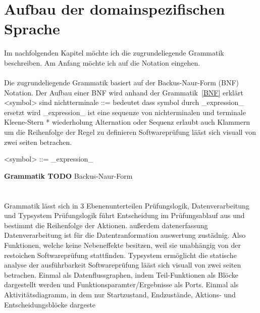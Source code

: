 \documentclass{article}
\begin{document}
    \section{Aufbau der domainspezifischen Sprache}
    Im nachfolgenden Kapitel möchte ich die zugrundeliegende Grammatik beschreiben. Am Anfang möchte ich auf die Notation eingehen.\\\\
    Die zugrundeliegende Grammatik basiert auf der Backus-Naur-Form (BNF) Notation. Der Aufbau einer BNF wird anhand der Grammatik~\ref{BNF} erklärt
    <symbol> sind nichtterminale
    ::= bedeutet dass symbol durch _expression_ ersetzt wird
    _expression_ ist eine sequenze von nichterminalen und terminale
    Kleene-Stern * wiederholung
    Alternation \textbar  oder
    Sequenz erlaubt auch Klammern um die Reihenfolge der Regel zu definieren
    Softwareprüfung lääst sich visuall von zwei seiten betrachen. 
    \begin{grammar}
        <symbol> ::= _expression_
    \end{grammar}
    \textbf{Grammatik TODO} Backus-Naur-Form\\\\\\
    \label{BNF}
    Grammatik lässt sich in 3 Ebenenunterteilen Prüfungslogik, Datenverarbeitung und Typsystem
    Prüfungslogik führt Entscheidung im Prüfungsablauf aus und bestimmt die Reihenfolge der Aktionen. außerdem datenerfassung
    Datenverarbeitung ist für die Datentranformation auswertung zustädnig. Also Funktionen, welche keine Nebeneffekte besitzen, weil sie unabhängig von der restoichen Softwareprüfung stattfinden.
    Typsystem ermöglicht die statische analyse der ausführbarkeit
    Softwareprüfung lääst sich visuall von zwei seiten betrachen. 
    Einmal als Datenflussgraphen, indem Teil-Funktionen als Blöcke dargestellt werden und Funktionsparamter/Ergebnisse als Ports.
    Einmal als Aktivitätsdiagramm, in dem nur Startzustand, Endzustände, Aktions- und Entscheidungsblöcke dargeste
\end{document}

